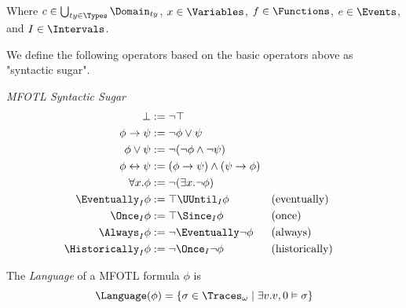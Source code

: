 \begin{definition}
    Where $c \in \bigcup_{ty \in \Types} \Domain_{ty}$,
    $x \in \Variables$,
    $f \in \Functions$,
    $e \in \Events$,
    and $I \in \Intervals$.
    
\end{definition}

We define the following operators based on the basic operators above as
"syntactic sugar".
\begin{definition}
    \label{def:mfotl-syntactic-sugar}
    \emph{MFOTL Syntactic Sugar}
    \begin{align*}
        \bot &:= \neg\top \\
        \phi \to \psi &:= \neg \phi \vee \psi \\
        \phi \vee \psi &:= \neg(\neg\phi \wedge \neg\psi) \\
        \phi \leftrightarrow \psi
            &:= (\phi \to \psi) \wedge (\psi \to \phi) \\
        \forall x. \phi &:= \neg(\exists x. \neg \phi) \\
        \Eventually_I \phi &:= \top \UUntil_I \phi && \text{(eventually)}\\
        \Once_I \phi &:= \top \Since_I \phi && \text{(once)}\\
        \Always_I \phi &:= \neg \Eventually \neg \phi && \text{(always)} \\
        \Historically_I \phi &:= \neg \Once_I \neg \phi && \text{(historically)}
    \end{align*}    
\end{definition}

\begin{definition}
    \label{def:mfotl-formula-language}
    The \emph{Language} of a MFOTL formula $\phi$ is
    $$
    \Language(\phi)
    = \left\lbrace
    \sigma \in \Traces_\omega \mid \exists v. v,0 \vDash \sigma
    \right\rbrace
    $$
\end{definition}

